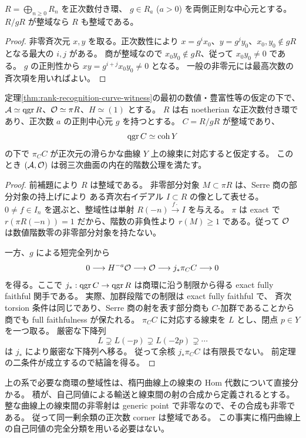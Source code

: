 \begin{lemma}[正次数正則元からの整域性]
\label{lem:graded-domain-normal-extension}
$R=\bigoplus_{n\ge0}R_n$ を正次数付き環、
$g\in R_a$ ($a>0$) を両側正則な中心元とする。
$R/gR$ が整域なら $R$ も整域である。
\end{lemma}
\begin{proof}
非零斉次元 $x,y$ を取る。正次数性により
$x=g^i x_0$、$y=g^j y_0$、$x_0,y_0\notin gR$ となる最大の $i,j$ がある。
商が整域なので $x_0y_0\notin gR$、従って $x_0y_0\ne0$ である。
$g$ の正則性から $xy=g^{i+j}x_0y_0\ne0$ となる。
一般の非零元には最高次数の斉次項を用いればよい。
\end{proof}

\begin{corollary}[整域と曲線因子からの弱階数公理]
\label{cor:elliptic-divisor-rank}
定理\ref{thm:rank-recognition-curve-witness}の最初の数値・豊富性等の仮定の下で、
$\mathcal A\simeq\operatorname{qgr} R$、$\mathcal O\simeq\pi R$、$H\simeq(1)$ とする。
$R$ は右 noetherian な正次数付き環であり、正次数 $a$ の正則中心元 $g$ を持つとする。
$C=R/gR$ が整域であり、
\[
 \operatorname{qgr} C\simeq\operatorname{coh}Y
\]
の下で $\pi_C C$ が正次元の滑らかな曲線 $Y$ 上の線束に対応すると仮定する。
このとき $(\mathcal A,\mathcal O)$ は弱三次曲面の内在的階数公理を満たす。
\end{corollary}
\begin{proof}
前補題により $R$ は整域である。
非零部分対象 $M\subset\pi R$ は、Serre 商の部分対象の持上げにより
ある斉次右イデアル $I\subset R$ の像として表せる。
$0\ne f\in I_n$ を選ぶと、整域性は単射
$R(-n)\xrightarrow{f\cdot}I$ を与える。
$\pi$ は exact で $r(\pi R(-n))=1$ だから、階数の非負性より
$r(M)\ge1$ である。従って $\mathcal O$ は数値階数零の非零部分対象を持たない。

一方、$g$ による短完全列から
\[
 0\longrightarrow H^{-a}\mathcal O\longrightarrow\mathcal O
 \longrightarrow j_*\pi_C C\longrightarrow0
\]
を得る。ここで $j_*:\operatorname{qgr} C\to\operatorname{qgr} R$ は商環に沿う制限から得る
exact fully faithful 関手である。
実際、加群段階での制限は exact fully faithful で、
斉次 torsion 条件は同じであり、Serre 商の射を表す部分商も
$C$-加群であることから商でも full faithfulness が保たれる。
$\pi_C C$ に対応する線束を $L$ とし、閉点 $p\in Y$ を一つ取る。
厳密な下降列
\[
 L\supsetneq L(-p)\supsetneq L(-2p)\supsetneq\cdots
\]
は $j_*$ により厳密な下降列へ移る。
従って余核 $j_*\pi_C C$ は有限長でない。
前定理の二条件が成立するので結論を得る。
\end{proof}

\begin{remark}
上の系で必要な商環の整域性は、楕円曲線上の線束の Hom 代数について直接分かる。
積が、自己同値による輸送と線束間の射の合成から定義されるとする。
整な曲線上の線束間の非零射は generic point で非零なので、その合成も非零である。
従って同一剰余類の正次数 corner は整域である。
この事実に楕円曲線上の自己同値の完全分類を用いる必要はない。
\end{remark}



